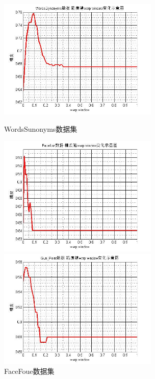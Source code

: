 \documentclass{ctexart}
\begin{document}
\begin{itemize}
\begin{enumerate}
            \begin{figure}
                \begin{minipage}{0.5\linewidth}
                \centering
                \includegraphics[width=3in]{6.jpg}
                \caption{WordsSunonyms数据集}
                \label{fig:side:a}
                \end{minipage}%
                \hfill
                \begin{minipage}{0.5\linewidth}
                \centering
                \includegraphics[width=3in]{3.jpg}
                \caption{FaceFoue数据集}
                \label{fig:side:b}
                \end{minipage}
                \vfill
                \begin{minipage}{0.5\linewidth}
                \centering
                \includegraphics[width=3in]{4.jpg}

\end{minipage}
\end{figure}
\end{enumerate}
\end{itemize}
\end{document}
